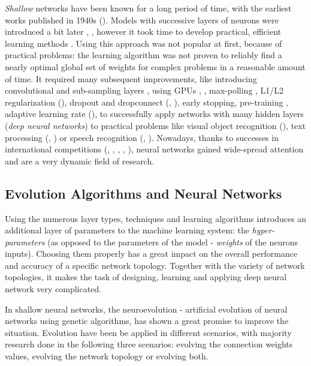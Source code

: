 \documentclass{llncs}
\begin{document}
\emph{Shallow} networks have been known for a long period of time, with the earliest works published in 1940s (\cite{McCulloch1943}). Models with successive layers of neurons were introduced a bit later \cite{rosenblatt1958}, \cite{Narendra:74}, however it took time to develop practical, efficient learning methods \cite{Werbos:81sensitivity}. Using this approach was not popular at first, because of practical problems: the learning algorithm was not proven to reliably find a nearly optimal global set of weights for complex problems in a reasonable amount of time. It required many subsequent improvements, like introducing convolutional and sub-sampling layers \cite{Fukushima:1979neocognitron}, using GPUs \cite{chellapilla:2006b}, \cite{ranzato:2006}, max-polling \cite{weng1992}, L1/L2 regularization (\cite{Ng2004}), dropout and dropconnect (\cite{Srivastava2014}, \cite{Wan2013}), early stopping, pre-training \cite{Courville2010}, adaptive learning rate (\cite{Cho2011}), to successfully apply networks with many hidden layers (\emph{deep neural networks}) to practical problems like visual object recognition (\cite{Krizhevsky2012}), text processing (\cite{Bengio2003}, \cite{Collobert2008}) or speech recognition (\cite{Dahl2012}, \cite{Hinton2012}). Nowadays, thanks to successes in international competitions (\cite{seung2009}, \cite{stallkamp:11}, \cite{stallkamp:12}, \cite{ciresan:2010deepbig_arxiv}, \cite{ciresan:2011ijcnn}), neural networks gained wide-spread attention and are a very dynamic field of research.

\subsection{Evolution Algorithms and Neural Networks}

Using the numerous layer types, techniques and learning algorithms introduces an additional layer of parameters to the machine learning system: the \emph{hyper-parameters} (as opposed to the parameters of the model - \emph{weights} of the neurons inputs). Choosing them properly has a great impact on the overall performance and accuracy of a specific network topology. Together with the variety of network topologies, it makes the task of designing, learning and applying deep neural network very complicated.  

In shallow neural networks, the neuroevolution - artificial evolution of neural networks using genetic algorithms, has shown a great promise to improve the situation. Evolution have been be applied in different scenarios, with majority research done in the following three scenarios: evolving the connection weights values, evolving the network topology or evolving both. 
\end{document}

